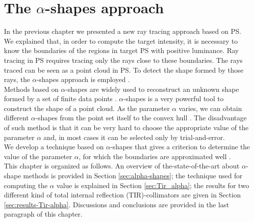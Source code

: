\chapter{The $\alpha$-shapes approach}\label{chap:boundaries_alpha}
In the previous chapter we presented a new ray tracing approach based on PS. We explained that, in order to compute the target intensity, it is necessary to know the boundaries of the regions in target PS with positive luminance. Ray tracing in PS requires tracing only the rays close to these boundaries. The rays traced can be seen as a point cloud in PS. To detect the shape formed by those rays, the $\alpha$-shapes approach is employed \cite{portegies2013fast}.\\ \indent
Methods based on $\alpha$-shapes are widely used to reconstruct an unknown shape formed by a set of finite data points \cite{guo1997surface}. $\alpha$-shapes is a very powerful tool to construct the shape of a point cloud. As the parameter $\alpha$ varies, we can obtain different $\alpha$-shapes from the point set itself to the convex
hull \cite{xu2003automatic}. The disadvantage of such method is that it can be very hard to choose the appropriate value of the parameter $\alpha$ and, in most cases it can be selected only by trial-and-error.\\ \indent
We develop a technique based on $\alpha$-shapes that gives a criterion to determine the value of the parameter $\alpha$, for which the boundaries are approximated well \cite{filosa2015new}.\\ \indent This chapter is organized as follows. An overview of the-state-of-the-art about $\alpha$-shape methods is provided in Section \ref{sec:alpha-shapes}; the technique used for computing the $\alpha$ value is explained in Section \ref{sec:Tir_alpha}; the results for two different kind of total internal reflection (TIR)-collimators are given in Section \ref{sec:results-Tir-alpha}. Discussions and conclusions are provided in the last paragraph of this chapter.
